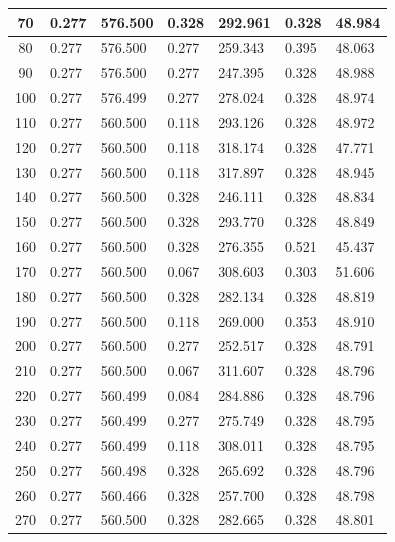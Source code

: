 \documentclass{report}
\begin{document}
\begin{minipage}{\textwidth}
\begin{longtable}{|c|l|l|l|l|l|l|}
                     70 & 0.277 & 576.500 & 0.328 & 292.961 & 0.328 & 48.984 \\ \hline
                     80 & 0.277 & 576.500 & 0.277 & 259.343 & 0.395 & 48.063 \\ \hline
                     90 & 0.277 & 576.500 & 0.277 & 247.395 & 0.328 & 48.988 \\ \hline
                     100 & 0.277 & 576.499 & 0.277 & 278.024 & 0.328 & 48.974 \\ \hline
                     110 & 0.277 & 560.500 & 0.118 & 293.126 & 0.328 & 48.972 \\ \hline
                     120 & 0.277 & 560.500 & 0.118 & 318.174 & 0.328 & 47.771 \\ \hline
                     130 & 0.277 & 560.500 & 0.118 & 317.897 & 0.328 & 48.945 \\ \hline
                     140 & 0.277 & 560.500 & 0.328 & 246.111 & 0.328 & 48.834 \\ \hline
                     150 & 0.277 & 560.500 & 0.328 & 293.770 & 0.328 & 48.849 \\ \hline
                     160 & 0.277 & 560.500 & 0.328 & 276.355 & 0.521 & 45.437 \\ \hline
                     170 & 0.277 & 560.500 & 0.067 & 308.603 & 0.303 & 51.606 \\ \hline
                     180 & 0.277 & 560.500 & 0.328 & 282.134 & 0.328 & 48.819 \\ \hline
                     190 & 0.277 & 560.500 & 0.118 & 269.000 & 0.353 & 48.910 \\ \hline
                     200 & 0.277 & 560.500 & 0.277 & 252.517 & 0.328 & 48.791 \\ \hline
                     210 & 0.277 & 560.500 & 0.067 & 311.607 & 0.328 & 48.796 \\ \hline
                     220 & 0.277 & 560.499 & 0.084 & 284.886 & 0.328 & 48.796 \\ \hline
                     230 & 0.277 & 560.499 & 0.277 & 275.749 & 0.328 & 48.795 \\ \hline
                     240 & 0.277 & 560.499 & 0.118 & 308.011 & 0.328 & 48.795 \\ \hline
                     250 & 0.277 & 560.498 & 0.328 & 265.692 & 0.328 & 48.796 \\ \hline
                     260 & 0.277 & 560.466 & 0.328 & 257.700 & 0.328 & 48.798 \\ \hline
                     270 & 0.277 & 560.500 & 0.328 & 282.665 & 0.328 & 48.801 \\ \hline

\end{longtable}
\end{minipage}
\end{document}
